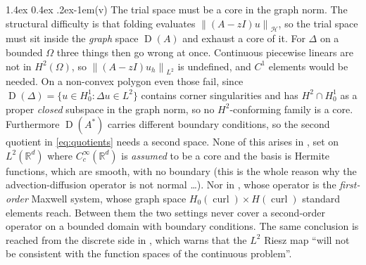 \documentclass[11pt,a4paper]{article}
\makeatletter
\newcommand{\uzt}[1]{\textcolor{teal!80!black}{#1}}   %
\newcommand{\R}{\mathbb{R}}
\newcommand{\norm}[1]{\left\|#1\right\|}
\newcommand{\Hb}{\mathcal{H}}
\DeclareMathOperator{\dom}{D}
\DeclareMathOperator{\curl}{curl}
\renewcommand\paragraph{\@startsection{paragraph}{4}{\z@}%
  {1.4ex \@plus0.4ex \@minus.2ex}{-1em}{\normalfont\normalsize\bfseries}}
\makeatother
\begin{document}
\paragraph{(v) The trial space must be a core in the graph norm.}
The structural difficulty is that folding evaluates
$\norm{(A-zI)u}_{\Hb}$, so the trial space must sit inside the \emph{graph}
space $\dom(A)$ and exhaust a core of it.  For $\Delta$ on a bounded $\Omega$
\uzt{three} things then go wrong at once.  Continuous piecewise linears are not in
$H^2(\Omega)$, so $\norm{(A - zI)u_h}_{L^2}$ is undefined, and
$C^1$ elements would be needed.  On a non-convex polygon even those fail, since
$\dom(\Delta) = \{u \in H^1_0 : \Delta u \in L^2\}$ contains corner
singularities and has $H^2 \cap H^1_0$ as a proper \emph{closed} subspace in the
graph norm, so no $H^2$-conforming family is a core. Furthermore $\dom(A^*)$ carries different boundary
conditions, so the second quotient in \eqref{eq:quotients} needs a second space.
None of this arises in \cite[\S\S3.4.2--3.4.3]{Colbrook2026}, set on $L^2(\R^d)$
where $C^\infty_c(\R^d)$ is \emph{assumed} to be a core and the basis is Hermite
functions, which are smooth, with no boundary (this is the whole reason why the advection-diffusion operator is not normal \dots). 
Nor in \cite[\S3.4.4]{Colbrook2026}, whose operator is the \emph{first-order} Maxwell
system, whose graph space $H_0(\curl) \times H(\curl)$ standard elements reach.
Between them the two settings never cover a second-order operator on a bounded
domain with boundary conditions.  The same conclusion is reached from the
discrete side in \cite[Rmk~3.7]{LazzarinoNakatsukasaZerbinati2026}, which warns
that the $L^2$ Riesz map ``will not be consistent with the function spaces of
the continuous problem''.
\end{document}
